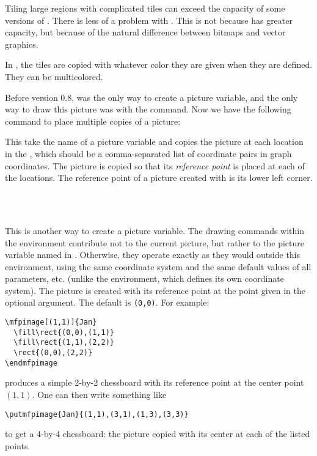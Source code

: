 \documentclass[letterpaper]{article}
\begin{document}
Tiling large regions with complicated tiles can exceed the capacity of
some versions of \MP{}. There is less of a problem with \MF{}. This is not
because \MF{} has greater capacity, but because of the natural
difference between bitmaps and vector graphics.

In \MP{}, the tiles are copied with whatever color they are given when
they are defined. They can be multicolored.

Before version 0.8,  was the only way to create a picture
variable, and the only way to draw this picture was with the 
command. Now we have the following command to place multiple copies of
a picture:

\begin{cd}
\end{cd}

This take the name of a picture variable and copies the picture at each
location in the , which should be a comma-separated list of
coordinate pairs in graph coordinates. The picture is copied so that its
\emph{reference point} is placed at each of the locations. The reference
point of a picture created with  is its lower left corner.

\begin{cd}
  \\
  \ \\
%
\end{cd}

This is another way to create a picture variable. The drawing commands
within the  environment contribute not to the current
\mfp{} picture, but rather to the picture variable named in .
Otherwise, they operate exactly as they would outside this environment,
using the same coordinate system and the same default values of all
parameters, etc. (unlike the  environment, which defines its
own coordinate system). The picture is created with its reference point
at the point  given in the optional argument. The default is
\texttt{(0,0)}. For example:
\begin{verbatim}
\mfpimage[(1,1)]{Jan}
  \fill\rect{(0,0),(1,1)}
  \fill\rect{(1,1),(2,2)}
  \rect{(0,0),(2,2)}
\endmfpimage
\end{verbatim}
produces a simple 2-by-2 chessboard with its reference point at the
center point $(1,1)$. One can then write something like
\begin{verbatim}
\putmfpimage{Jan}{(1,1),(3,1),(1,3),(3,3)}
\end{verbatim}
to get a 4-by-4 chessboard: the picture  copied with its
center at each of the listed points.
\end{document}
